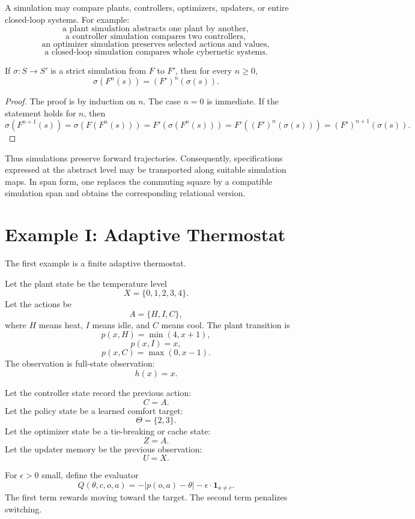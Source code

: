 A simulation may compare plants, controllers, optimizers, updaters, or entire closed-loop systems.
For example:
\[
\text{a plant simulation abstracts one plant by another},
\]
\[
\text{a controller simulation compares two controllers},
\]
\[
\text{an optimizer simulation preserves selected actions and values},
\]
\[
\text{a closed-loop simulation compares whole cybernetic systems}.
\]

\begin{proposition}
\label{prop:simulation-forward-behaviour}
If \(\sigma:S\to S'\) is a strict simulation from \(F\) to \(F'\), then for every \(n\geq 0\),
\[
\sigma(F^n(s))=(F')^n(\sigma(s)).
\]
\end{proposition}

\begin{proof}
The proof is by induction on \(n\).  The case \(n=0\) is immediate.  If the statement holds for
\(n\), then
\[
\sigma(F^{n+1}(s))
=
\sigma(F(F^n(s)))
=
F'(\sigma(F^n(s)))
=
F'((F')^n(\sigma(s)))
=
(F')^{n+1}(\sigma(s)).
\]
\end{proof}

Thus simulations preserve forward trajectories.  Consequently, specifications expressed at the
abstract level may be transported along suitable simulation maps.  In span form, one replaces the
commuting square by a compatible simulation span and obtains the corresponding relational version.

\section{Example I: Adaptive Thermostat}
\label{sec:example-adaptive-thermostat}

The first example is a finite adaptive thermostat.

Let the plant state be the temperature level
\[
X=\{0,1,2,3,4\}.
\]
Let the actions be
\[
A=\{H,I,C\},
\]
where \(H\) means heat, \(I\) means idle, and \(C\) means cool.  The plant transition is
\[
p(x,H)=\min(4,x+1),
\]
\[
p(x,I)=x,
\]
\[
p(x,C)=\max(0,x-1).
\]
The observation is full-state observation:
\[
h(x)=x.
\]

Let the controller state record the previous action:
\[
C=A.
\]
Let the policy state be a learned comfort target:
\[
\Theta=\{2,3\}.
\]
Let the optimizer state be a tie-breaking or cache state:
\[
Z=A.
\]
Let the updater memory be the previous observation:
\[
U=X.
\]

For \(\epsilon>0\) small, define the evaluator
\[
Q(\theta,c,o,a)
=
-\left|p(o,a)-\theta\right|
-\epsilon\cdot \mathbf 1_{a\neq c}.
\]
The first term rewards moving toward the target.  The second term penalizes switching.

